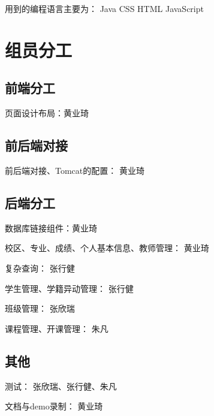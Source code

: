 \documentclass[../report.tex]{subfiles}
\begin{document}
用到的编程语言主要为： Java CSS HTML JavaScript

\section{组员分工}

\subsection{前端分工}

页面设计布局：黄业琦

\subsection{前后端对接}

前后端对接、Tomcat的配置： 黄业琦

\subsection{后端分工}

数据库链接组件：黄业琦

校区、专业、成绩、个人基本信息、教师管理： 黄业琦

复杂查询： 张行健

学生管理、学籍异动管理： 张行健

班级管理： 张欣瑞

课程管理、开课管理： 朱凡

\subsection {其他}

测试： 张欣瑞、张行健、朱凡

文档与demo录制： 黄业琦
\end{document}
